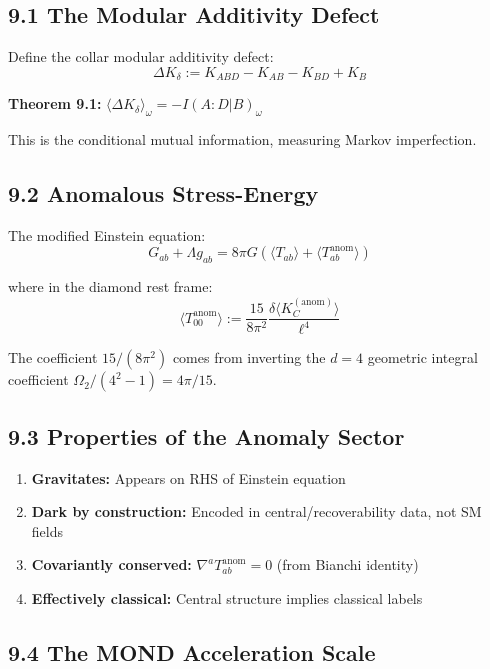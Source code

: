 \subsection{9.1 The Modular Additivity Defect}\label{91-the-modular-additivity-defect}

Define the collar modular additivity defect: \[\Delta K_\delta := K_{ABD} - K_{AB} - K_{BD} + K_B\]

\textbf{Theorem 9.1:} \(\langle \Delta K_\delta \rangle_\omega = -I(A:D|B)_\omega\)

This is the conditional mutual information, measuring Markov imperfection.

\subsection{9.2 Anomalous Stress-Energy}\label{92-anomalous-stress-energy}

The modified Einstein equation: \[G_{ab} + \Lambda g_{ab} = 8\pi G \left(\langle T_{ab} \rangle + \langle T_{ab}^{\text{anom}} \rangle\right)\]

where in the diamond rest frame: \[\langle T_{00}^{\text{anom}} \rangle := \frac{15}{8\pi^2} \frac{\delta\langle K_C^{(\text{anom})} \rangle}{\ell^4}\]

The coefficient \(15/(8\pi^2)\) comes from inverting the \(d=4\) geometric integral coefficient \(\Omega_2/(4^2-1) = 4\pi/15\).

\subsection{9.3 Properties of the Anomaly Sector}\label{93-properties-of-the-anomaly-sector}

\begin{enumerate}
\def\labelenumi{\arabic{enumi}.}
\tightlist
\item
  \textbf{Gravitates:} Appears on RHS of Einstein equation
\item
  \textbf{Dark by construction:} Encoded in central/recoverability data, not SM fields
\item
  \textbf{Covariantly conserved:} \(\nabla^a T_{ab}^{\text{anom}} = 0\) (from Bianchi identity)
\item
  \textbf{Effectively classical:} Central structure implies classical labels
\end{enumerate}

\subsection{9.4 The MOND Acceleration Scale}\label{94-the-mond-acceleration-scale}

